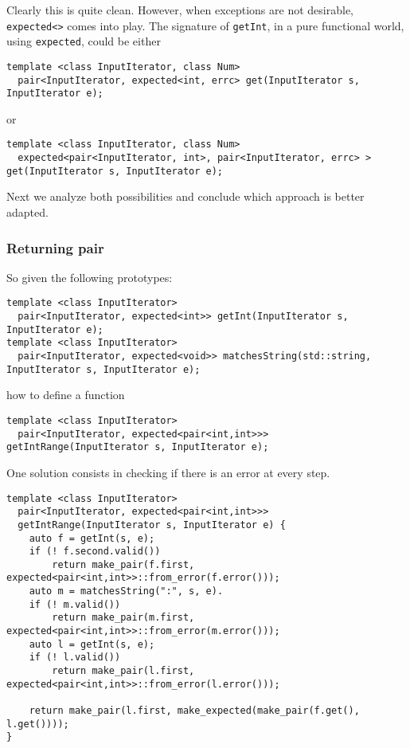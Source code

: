 \documentclass[a4paper,10pt]{article}
\newcommand{\cpp}[1]{\lstinline{#1}}
\begin{document}
Clearly this is quite clean. However, when exceptions are not desirable, \cpp{expected<>} comes into play. 
The signature of \cpp{getInt}, in a pure functional world,  using \cpp{expected}, could be either

\begin{lstlisting}
template <class InputIterator, class Num>
  pair<InputIterator, expected<int, errc> get(InputIterator s, InputIterator e);
\end{lstlisting}

or 

\begin{lstlisting}
template <class InputIterator, class Num>
  expected<pair<InputIterator, int>, pair<InputIterator, errc> > get(InputIterator s, InputIterator e);
\end{lstlisting}

Next we analyze both possibilities and conclude which approach is better adapted.

\subsubsection{Returning pair}

So given the following prototypes:

\begin{lstlisting}
template <class InputIterator>
  pair<InputIterator, expected<int>> getInt(InputIterator s, InputIterator e);
template <class InputIterator>
  pair<InputIterator, expected<void>> matchesString(std::string, InputIterator s, InputIterator e);
\end{lstlisting}

\noindent
how to define a function

\begin{lstlisting}
template <class InputIterator>
  pair<InputIterator, expected<pair<int,int>>> getIntRange(InputIterator s, InputIterator e);
\end{lstlisting}


One solution consists in checking if there is an error at every step. 

\begin{lstlisting}
template <class InputIterator>
  pair<InputIterator, expected<pair<int,int>>> 
  getIntRange(InputIterator s, InputIterator e) {
    auto f = getInt(s, e);
    if (! f.second.valid())  
        return make_pair(f.first, expected<pair<int,int>>::from_error(f.error()));
    auto m = matchesString(":", s, e).
    if (! m.valid())  
        return make_pair(m.first, expected<pair<int,int>>::from_error(m.error()));
    auto l = getInt(s, e);
    if (! l.valid())   
        return make_pair(l.first, expected<pair<int,int>>::from_error(l.error()));
        
    return make_pair(l.first, make_expected(make_pair(f.get(), l.get())));
}
\end{lstlisting}
\end{document}
